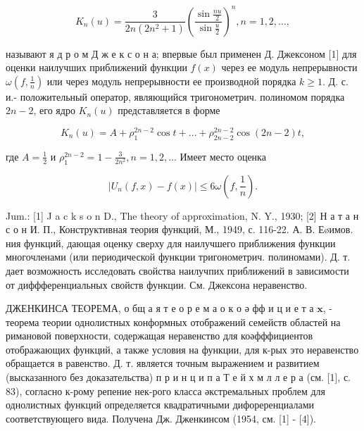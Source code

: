 \documentclass[10pt]{article}
\begin{document}
\[

K_{n}(u)=\frac{3}{2 n\left(2 n^{2}+1\right)}\left(\frac{\sin \frac{n u}{2}}{\sin \frac{u}{2}}\right)^{n}, n=1,2, \ldots,

\]



называют я д р о м Д ж е к с о н а; впервые был применен Д. Джексоном [1] для оценки наилучших приближений функции $f(x)$ через ее модуль непрерывности $\omega\left(f, \frac{1}{n}\right)$ или через модуль непрерывности ее производной порядка $k \geqslant 1$. Д. с. и.- положительный оператор, являющийся тригонометрич. полиномом порядка $2 n-2$, его ядро $K_{n}(u)$ представляется в форме



\[

K_{n}(u)=A+\rho_{1}^{2 n-2} \cos t+\ldots+\rho_{2 n-2}^{2 n-2} \cos (2 n-2) t,

\]



где $A=\frac{1}{2}$ и $\rho_{1}^{2 n-2}=1-\frac{3}{2 n^{2}}, n=1,2, \ldots$ Имеет место оценка



\[

\left|U_{n}(f, x)-f(x)\right| \leqslant 6 \omega\left(f, \frac{1}{n}\right) .

\]



Jum.: [1] J a c k s o n D., The theory of approximation, N. Y., 1930; [2] Н а т а н с о н И. П., Конструктивная теория функций, М., 1949, с. 116-22. А. В. Еøимов. ния функций, дающая оценку сверху для наилучшего приближения функции многочленами (или периодической функции тригонометрич. полиномами). Д. т. дает возможность исследовать свойства наилучпих приближений в зависимости от диффференциальных свойств функции. См. Джексона неравенство.



ДЖЕНКИНСА ТЕОРЕМА, о бщ а я т е о р е м а о к о ә фф и ц и е т а $\mathbf{x}$, - теорема теории однолистных конформных отображений семейств областей на римановой поверхности, содержащая неравенство для коәфффициентов отображающих функций, а также условия на функции, для к-рых это неравенство обращается в равенство. Д. т. является точным выражением и развитием (высказанного без доказательства) п р и н ц и п а Т е й х м л л е р а (см. [1], с. 83), согласно к-рому репение нек-рого класса әкстремальных проблем для однолистных функций определяется квадратичными дифореренциалами соответствующего вида. Получена Дж. Дженкинсом (1954, см. [1] - [4]).
\end{document}
